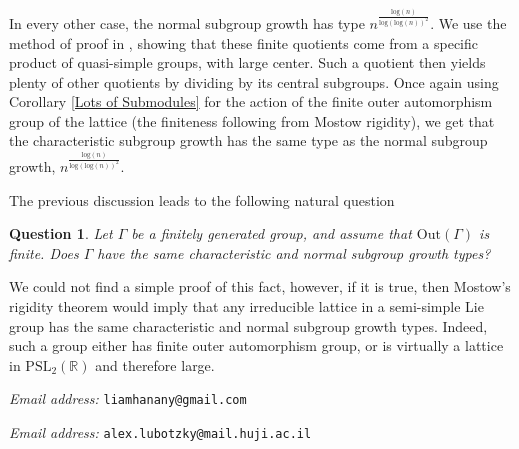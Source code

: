 \documentclass[letterpaper]{amsart}
\newtheorem{question}[theorem]{Question}
\begin{document}
In every other case, the normal subgroup growth has type $n^{\frac{\mathrm{log}(n)}{\mathrm{log}(\mathrm{log}(n))^2}}.$ We use the method of proof in \cite{larsen2004g2}, showing that these finite quotients come from a specific product of quasi-simple groups, with large center. Such a quotient then yields plenty of other quotients by dividing by its central subgroups. Once again using Corollary \ref{Lots of Submodules} for the action of the finite outer automorphism group of the lattice (the finiteness following from Mostow rigidity), we get that the characteristic subgroup growth has the same type as the normal subgroup growth, $n^{\frac{\mathrm{log}(n)}{\mathrm{log}(\mathrm{log}(n))^2}}$.

The previous discussion leads to the following natural question
\begin{question}
Let $\Gamma$ be a finitely generated group, and assume that $\mathrm{Out}(\Gamma)$ is finite. Does $\Gamma$ have the same characteristic and normal subgroup growth types?
\end{question}
We could not find a simple proof of this fact, however, if it is true, then Mostow's rigidity theorem would imply that any irreducible lattice in a semi-simple Lie group has the same characteristic and normal subgroup growth types. Indeed, such a group either has finite outer automorphism group, or is virtually a lattice in $\mathrm{PSL}_2(\mathbb{R})$ and therefore large.



\vspace{2cm}




\textit{Email address:} \texttt{liamhanany@gmail.com}

\vspace{0.5cm}





\textit{Email address:} \texttt{alex.lubotzky@mail.huji.ac.il}
\end{document}
